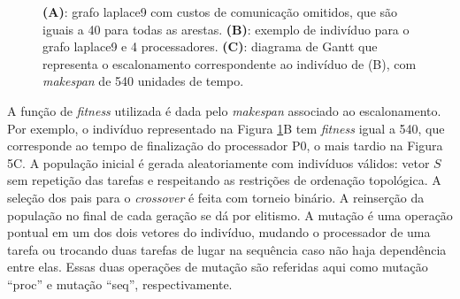 \documentclass[fleqn,10pt]{SelfArx} %
\begin{document}
\begin{figure}
  \centering
  \caption{ \textbf{(A)}: grafo laplace9 com custos de comunicação omitidos, que são iguais a 40 para todas as arestas.
  \textbf{(B)}: exemplo de indivíduo para o grafo laplace9 e 4 processadores.
  \textbf{(C)}: diagrama de Gantt que representa o escalonamento correspondente ao indivíduo de (B), com \textit{makespan} de 540 unidades de tempo.}
  \label{fig:repr}
\end{figure}


A função de \textit{fitness} utilizada é dada pelo \textit{makespan} associado ao escalonamento. Por exemplo, o indivíduo representado na Figura \ref{fig:repr}B tem \textit{fitness} igual a 540, que corresponde ao tempo de finalização do processador P0, o mais tardio na Figura 5C. A população inicial é gerada aleatoriamente com indivíduos válidos: vetor \(S\) sem repetição das tarefas e respeitando as restrições de ordenação topológica. A seleção dos pais para o \textit{crossover} é feita com torneio binário. A reinserção da população no final de cada geração se dá por elitismo. A mutação é uma operação pontual em um dos dois vetores do indivíduo, mudando o processador de uma tarefa ou trocando duas tarefas de lugar na sequência caso não haja dependência entre elas. Essas duas operações de mutação são referidas aqui como mutação ``proc'' e mutação ``seq'', respectivamente.
\end{document}
